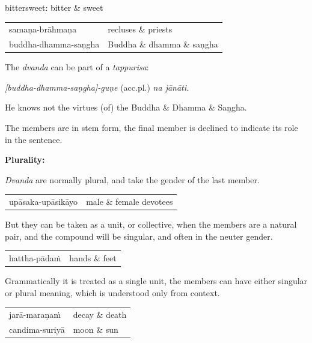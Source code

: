 \documentclass[11pt,oneside]{memoir}
\begin{document}
bittersweet: bitter \& sweet

\begin{center}
\begin{tabular}{ll}
samaṇa-brāhmaṇa & recluses \& priests\\[0pt]
buddha-dhamma-saṇgha & Buddha \& dhamma \& saṇgha\\[0pt]
\end{tabular}
\end{center}

The \emph{dvanda} can be part of a \emph{tappurisa}:

\emph{[buddha-dhamma-saṇgha]-guṇe} (acc.pl.) \emph{na jānāti.}

He knows not the virtues (of) the Buddha \& Dhamma \& Saṇgha.

The members are in stem form, the final member is declined to indicate its role in the sentence.

\textbf{Plurality:}

\emph{Dvanda} are normally plural, and take the gender of the last member.

\begin{center}
\begin{tabular}{ll}
upāsaka-upāsikāyo & male \& female devotees\\[0pt]
\end{tabular}
\end{center}

But they can be taken as a unit, or collective, when the members are a natural
pair, and the compound will be singular, and often in the neuter gender.

\begin{center}
\begin{tabular}{ll}
hattha-pādaṁ & hands \& feet\\[0pt]
\end{tabular}
\end{center}

Grammatically it is treated as a single unit, the members can have either
singular or plural meaning, which is understood only from context.

\begin{center}
\begin{tabular}{ll}
jarā-maraṇaṁ & decay \& death\\[0pt]
candima-suriyā & moon \& sun\\[0pt]
\end{tabular}
\end{center}
\end{document}
